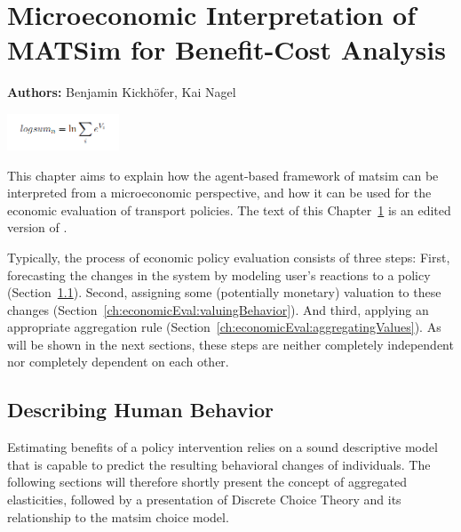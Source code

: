 \chapter{Microeconomic Interpretation of MATSim for Benefit-Cost Analysis}
\label{ch:economicEval}

\hfill \textbf{Authors:} Benjamin Kickhöfer, Kai Nagel

\begin{center} \includegraphics[width=0.25\textwidth, angle=0]{understanding/figures/logsum} \end{center}


This chapter aims to explain how the agent-based framework of \acrshort{matsim} can be interpreted from a microeconomic perspective, and how it can be used for the economic evaluation of transport policies. The text of this Chapter~\ref{ch:economicEval} is an edited version of \citet[][Section~2.3]{Kickhoefer2014PhD}.

Typically, the process of economic policy evaluation consists of three steps:
%
First, forecasting the changes in the system by modeling user's reactions to a policy (Section~\ref{ch:economicEval:describingBehavior}).
%
Second, assigning some (potentially monetary) valuation to these changes (Section~\ref{ch:economicEval:valuingBehavior}).
%
And third, applying an appropriate aggregation rule (Section~\ref{ch:economicEval:aggregatingValues}).
%
As will be shown in the next sections, these steps are neither completely independent nor completely dependent on each other.

\section{Describing Human Behavior}
\label{ch:economicEval:describingBehavior}
Estimating benefits of a policy intervention relies on a sound descriptive model that is capable to predict the resulting behavioral changes of individuals. The following sections will therefore shortly present the concept of aggregated elasticities, followed by a presentation of Discrete Choice Theory and its relationship to the \acrshort{matsim} choice model.

